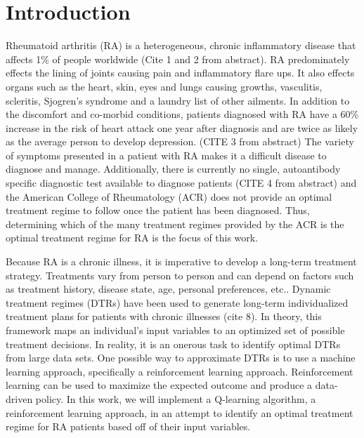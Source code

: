 \documentclass[10pt]{article}
\begin{document}
\section{Introduction}

Rheumatoid arthritis (RA) is a heterogeneous, chronic inflammatory disease that affects 1\% of people worldwide (Cite 1 and 2 from abstract). RA predominately effects the lining of joints causing pain and inflammatory flare ups. It also effects organs such as the heart, skin, eyes and lungs causing growths, vasculitis, scleritis, Sjogren's syndrome and a laundry list of other ailments. In addition to the discomfort and co-morbid conditions, patients diagnosed with RA have a 60\% increase in the risk of heart attack one year after diagnosis and are twice as likely as the average person to develop depression. (CITE 3 from abstract) The variety of symptoms presented in a patient with RA makes it a difficult disease to diagnose and manage. Additionally, there is currently no single, autoantibody specific diagnostic test available to diagnose patients (CITE 4 from abstract) and the American College of Rheumatology (ACR) does not provide an optimal treatment regime to follow once the patient has been diagnosed. Thus, determining which of the many treatment regimes provided by the ACR is the optimal treatment regime for RA is the focus of this work.

Because RA is a chronic illness, it is imperative to develop a long-term treatment strategy. Treatments vary from person to person and can depend on factors such as treatment history, disease state, age, personal preferences, etc.. Dynamic treatment regimes (DTRs) have been used to generate long-term individualized treatment plans for patients with chronic illnesses (cite 8). In theory, this framework maps an individual's input variables to an optimized set of possible treatment decisions. In reality, it is an onerous task to identify optimal DTRs from large data sets. One possible way to approximate DTRs is to use a machine learning approach, specifically a reinforcement learning approach. Reinforcement learning can be used to maximize the expected outcome and produce a data-driven policy. In this work, we will implement a Q-learning algorithm, a reinforcement learning approach, in an attempt to identify an optimal treatment regime for RA patients based off of their input variables.
\end{document}
